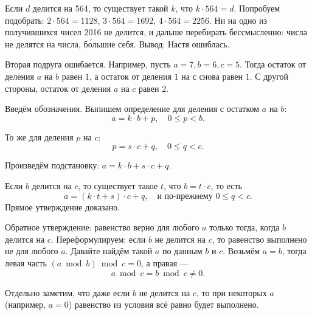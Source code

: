 \begin{itemize}
\itA Если $d$ делится на 564, то существует такой $k$, что $k \cdot 564 = d$. Попробуем подобрать:
$2 \cdot 564 = 1128$, $3 \cdot 564 = 1692$, $4 \cdot 564 = 2256$. Ни на одно из получившихся чисел
2016 не делится, и дальше перебирать бессмысленно: числа не делятся на числа, б\'ольшие себя.
Вывод: Настя ошиблась.

\itB Вторая подруга ошибается. Например, пусть $a = 7, b = 6, c = 5$. Тогда остаток от деления
$a$ на $b$ равен $1$, а остаток от деления $1$ на $с$ снова равен $1$. С другой стороны, остаток
от деления $a$ на $c$ равен 2.

\itC Введём обозначения.
Выпишем определение для деления с остатком $a$ на $b$:
	$$a = k \cdot b + p,\quad 0 \le p < b.$$

То же для деления $p$ на $c$:
	$$p = s \cdot c + q,\quad 0 \le q < c.$$ 

Произведём подстановку: $a = k \cdot b + s \cdot c + q$. 

Если $b$ делится на $c$, то существует
такое $t$, что $b = t\cdot c$, то есть
	$$a = (k \cdot t + s) \cdot c + q,\quad \text{и по-прежнему }0 \le q < c.$$
Прямое утверждение доказано.

Обратное утверждение: равенство верно для любого $a$ только тогда, когда $b$ делится на $c$. 
Переформулируем: если $b$ не делится на $c$, то равенство выполнено не для любого $a$.
Давайте найдём такой $a$ по данным $b$ и $c$.
Возьмём $a = b$, тогда левая часть $(a \bmod b) \bmod c = 0$,
а правая ---
	$$a \bmod c = b \bmod c \ne 0.$$

Отдельно заметим, что даже если $b$ не делится на $c$, то при некоторых $a$ (например, $a = 0$)
равенство из условия всё равно будет выполнено.

\end{itemize}
